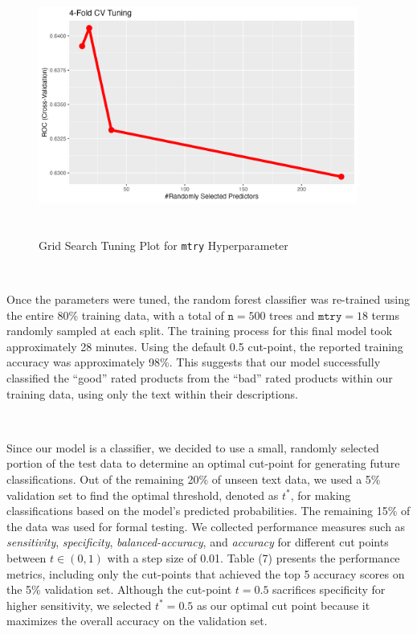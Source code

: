 \documentclass[10pt]{article}
\begin{document}
\begin{figure}[ht!]
    \centering
    \hspace*{-2em}
    \includegraphics[height=85mm, width=105mm]{desc_cv_rf_tuning.png}
    \caption{Grid Search Tuning Plot for \texttt{mtry} Hyperparameter}
\end{figure}

\


Once the parameters were tuned, the random forest classifier was re-trained using the entire 80\% training data, with a total of $\texttt{n}=500$ trees and $\texttt{mtry}=18$ terms randomly sampled at each split. The training process for this final model took approximately 28 minutes. Using the default 0.5 cut-point, the reported training accuracy was approximately 98\%. This suggests that our model successfully classified the ``good'' rated products from the ``bad'' rated products within our training data, using only the text within their descriptions.

\

Since our model is a classifier, we decided to use a small, randomly selected portion of the test data to determine an optimal cut-point for generating future classifications. Out of the remaining 20\% of unseen text data, we used a 5\% validation set to find the optimal threshold, denoted as $t^{*}$, for making classifications based on the model's predicted probabilities. The remaining 15\% of the data was used for formal testing. We collected performance measures such as \textit{sensitivity}, \textit{specificity}, \textit{balanced-accuracy}, and \textit{accuracy} for different cut points between $t \in (0, 1)$ with a step size of 0.01. Table (7) presents the performance metrics, including only the cut-points that achieved the top 5 accuracy scores on the 5\% validation set. Although the cut-point $t=0.5$ sacrifices specificity for higher sensitivity, we selected $t^{*}=0.5$ as our optimal cut point because it maximizes the overall accuracy on the validation set.
\end{document}
